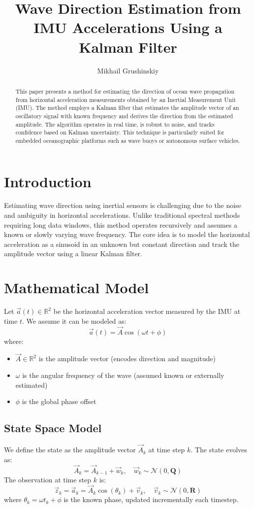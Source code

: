 \documentclass[12pt]{article}
\title{Wave Direction Estimation from IMU Accelerations Using a Kalman Filter}
\author{Mikhail Grushinskiy}
\affil{Independent Researcher, 2025}
\begin{document}
\maketitle

\begin{abstract}
This paper presents a method for estimating the direction of ocean wave propagation from horizontal acceleration measurements obtained by an Inertial Measurement Unit (IMU). The method employs a Kalman filter that estimates the amplitude vector of an oscillatory signal with known frequency and derives the direction from the estimated amplitude. The algorithm operates in real time, is robust to noise, and tracks confidence based on Kalman uncertainty. This technique is particularly suited for embedded oceanographic platforms such as wave buoys or autonomous surface vehicles.
\end{abstract}

\section{Introduction}
Estimating wave direction using inertial sensors is challenging due to the noise and ambiguity in horizontal accelerations. Unlike traditional spectral methods requiring long data windows, this method operates recursively and assumes a known or slowly varying wave frequency. The core idea is to model the horizontal acceleration as a sinusoid in an unknown but constant direction and track the amplitude vector using a linear Kalman filter.

\section{Mathematical Model}

Let \( \vec{a}(t) \in \mathbb{R}^2 \) be the horizontal acceleration vector measured by the IMU at time \( t \). We assume it can be modeled as:
\[
\vec{a}(t) = \vec{A} \cos(\omega t + \phi)
\]
where:
\begin{itemize}
  \item \( \vec{A} \in \mathbb{R}^2 \) is the amplitude vector (encodes direction and magnitude)
  \item \( \omega \) is the angular frequency of the wave (assumed known or externally estimated)
  \item \( \phi \) is the global phase offset
\end{itemize}

\subsection{State Space Model}
We define the state as the amplitude vector \( \vec{A}_k \) at time step \( k \). The state evolves as:
\[
\vec{A}_k = \vec{A}_{k-1} + \vec{w}_k, \quad \vec{w}_k \sim \mathcal{N}(0, \mathbf{Q})
\]
The observation at time step \( k \) is:
\[
\vec{z}_k = \vec{a}_k = \vec{A}_k \cos(\theta_k) + \vec{v}_k, \quad \vec{v}_k \sim \mathcal{N}(0, \mathbf{R})
\]
where \( \theta_k = \omega t_k + \phi \) is the known phase, updated incrementally each timestep.
\end{document}
